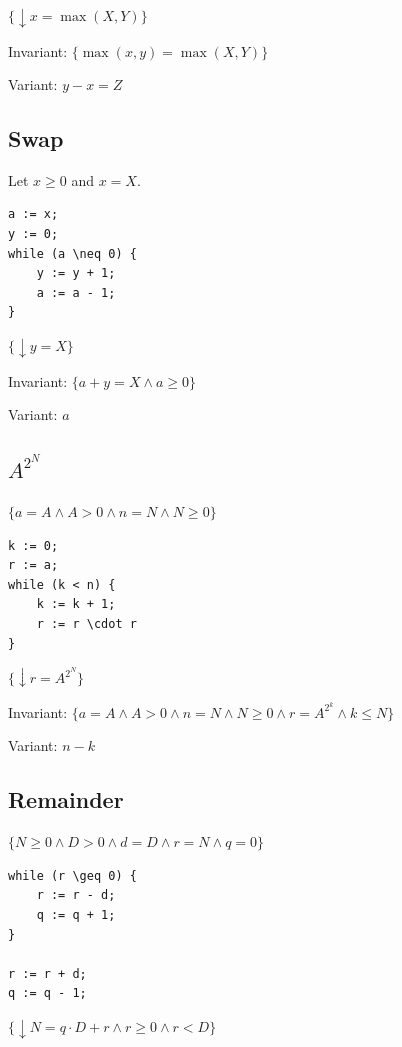 \documentclass{article}
\begin{document}
$\{\downarrow x = \max(X, Y)\}$

Invariant: $\{ \max(x, y) = \max(X, Y) \}$

Variant: $y - x = Z$

\subsection{Swap}

Let $x \geq 0$ and $x = X$.

\begin{lstlisting}[style=mystyle, caption=Haskell Code, label=code:haskell]
    a := x;
y := 0;
while (a \neq 0) {
    y := y + 1;
    a := a - 1;
}
\end{lstlisting}

$\{\downarrow y = X\}$

Invariant: $\{ a + y = X \land a \geq 0 \}$

Variant: $a$

\subsection{$A^{2^N}$}

$\{ a = A \land A > 0 \land n = N \land N \geq 0 \}$

\begin{lstlisting}[style=mystyle, caption=Haskell Code, label=code:haskell]
    k := 0;
r := a;
while (k < n) {
    k := k + 1;
    r := r \cdot r
}
\end{lstlisting}

$\{\downarrow r = A^{2^N}\}$

Invariant: $\{ a = A \land A > 0 \land n = N \land N \geq 0 \land r = A^{2^k} \land k \leq N \}$

Variant: $n - k$

\subsection{Remainder}

$\{ N \geq 0 \land D > 0 \land d = D \land r = N \land q = 0 \}$

\begin{lstlisting}[style=mystyle, caption=Haskell Code, label=code:haskell]
    while (r \geq 0) { 
    r := r - d; 
    q := q + 1;
} 

r := r + d;
q := q - 1;
\end{lstlisting}

$\{\downarrow N = q \cdot D + r \land r \geq 0 \land r < D\}$
\end{document}
